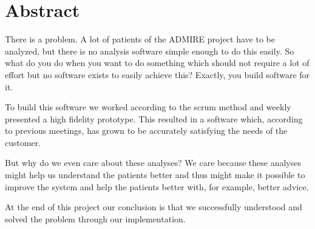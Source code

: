 \chapter*{Abstract}

There is a problem. A lot of patients of the ADMIRE project have to be analyzed, but there is no analysis software simple enough to do this easily. So what do you do when you want to do something which should not require a lot of effort but no software exists to easily achieve this? Exactly, you build software for it.

To build this software we worked according to the scrum method and weekly presented a high fidelity prototype. This resulted in a software which, according to previous meetings, has grown to be accurately satisfying the needs of the customer. %

But why do we even care about these analyses? We care because these analyses might help us understand the patients better and thus might make it possible to improve the system and help the patients better with, for example, better advice.

At the end of this project our conclusion is that we successfully understood and solved the problem through our implementation.

